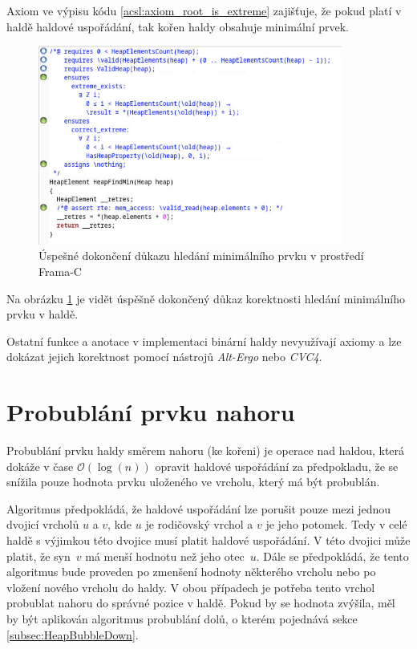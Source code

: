 Axiom ve výpisu kódu \ref{acsl:axiom_root_is_extreme} zajišťuje, že pokud platí v haldě haldové uspořádání, tak kořen haldy obsahuje minimální prvek.

\begin{figure}[H]
	\centering
	\includegraphics[width=10cm]{images/frama-c-HeapFindMin}
	\caption{Úspešné dokončení důkazu hledání minimálního prvku v prostředí Frama-C}
	\label{img:F-C-HeapFindMin}
\end{figure}

Na obrázku \ref{img:F-C-HeapFindMin} je vidět úspěšně dokončený důkaz korektnosti hledání minimálního prvku v haldě.

Ostatní funkce a anotace v implementaci binární haldy nevyužívají axiomy a lze dokázat jejich korektnost pomocí nástrojů \mbox{\textit{Alt-Ergo}} nebo \textit{CVC4}.

\section{Probublání prvku nahoru}
\label{subsec:HeapBubbleUp}

Probublání prvku haldy směrem nahoru (ke kořeni) je operace nad haldou, která dokáže v čase $\mathcal{O}(\log(n))$ opravit haldové uspořádání za předpokladu, že se snížila pouze hodnota prvku uloženého ve vrcholu, který má být probublán.

Algoritmus předpokládá, že haldové uspořádání lze porušit pouze mezi jednou dvojicí vrcholů $u$ a $v$, kde $u$ je rodičovský vrchol a $v$ je jeho potomek. Tedy v celé haldě s výjimkou této dvojice musí platit haldové uspořádání. V této dvojici může platit, že syn~$v$ má menší hodnotu než jeho otec~$u$. Dále se předpokládá, že tento algoritmus bude proveden po zmenšení hodnoty některého vrcholu nebo po vložení nového vrcholu do haldy. V obou případech je potřeba tento vrchol probublat nahoru do správné pozice v haldě. Pokud by se hodnota zvýšila, měl by být aplikován algoritmus probublání dolů, o kterém pojednává sekce \ref{subsec:HeapBubbleDown}.

